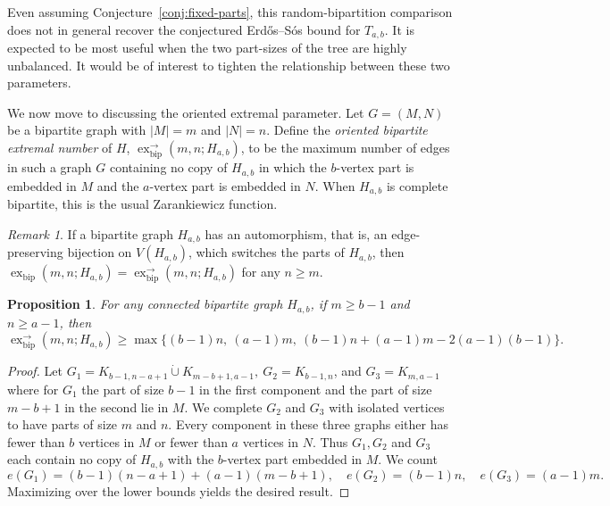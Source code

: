 \documentclass[12pt]{article}
\newtheorem{proposition}[theorem]{Proposition}
\theoremstyle{definition}
\theoremstyle{remark}
\newtheorem{remark}[theorem]{Remark}
\newcommand{\exbip}{\operatorname{ex}_{\mathrm{bip}}}
\newcommand{\exor}{\operatorname{ex}^{\rightarrow}_{\mathrm{bip}}}
\begin{document}
Even assuming Conjecture~\ref{conj:fixed-parts}, this random-bipartition comparison does not in general recover the conjectured Erd\H{o}s--S\'os bound for $T_{a,b}$. It is expected to be most useful when the two part-sizes of the tree are highly unbalanced. It would be of interest to tighten the relationship between these two parameters.

\medskip

We now move to discussing the oriented extremal parameter. Let $G=(M,N)$ be a bipartite graph with $|M|=m$ and $|N|=n$. Define the \textit{oriented bipartite extremal number} of $H$, $\exor(m,n;H_{a,b})$, to be the maximum number of edges in such a graph $G$ containing no copy of $H_{a,b}$ in which the $b$-vertex part is embedded in $M$ and the $a$-vertex part is embedded in $N$. When $H_{a,b}$ is complete bipartite, this is the usual Zarankiewicz function.

\begin{remark}
    If a bipartite graph $H_{a,b}$ has an automorphism, that is, an edge-preserving bijection on $V(H_{a,b})$, which switches the parts of $H_{a,b}$, then $\exbip(m,n;H_{a,b})=\exor(m,n;H_{a,b})$ for any $n\geq m$.
\end{remark}

\begin{proposition}
\label{prop:exor-LB}
        For any connected bipartite graph $H_{a,b}$, if $m\ge b-1$ and $n\ge a-1$, then
    \[
        \exor(m,n;H_{a,b})\ge\max\{(b-1)n,\ (a-1)m,\ (b-1)n+(a-1)m-2(a-1)(b-1)\}.
    \]
\end{proposition}
\begin{proof}
    Let $G_1=K_{b-1,n-a+1}\dot\cup K_{m-b+1,a-1},\ G_2=K_{b-1,n}$, and $G_3=K_{m,a-1}$
where for $G_1$ the part of size $b-1$ in the first component and the part of size $m-b+1$ in the second lie in $M$. We complete $G_2$ and $G_3$ with isolated vertices to have parts of size $m$ and $n$. Every component in these three graphs either has fewer than $b$ vertices in $M$ or fewer than $a$ vertices in $N$. Thus $G_1, G_2$ and $G_3$ each contain no copy of $H_{a,b}$ with the $b$-vertex part embedded in $M$. We count
    \[
        e(G_1)=(b-1)(n-a+1)+(a-1)(m-b+1),\quad e(G_2)=(b-1)n,\quad e(G_3)=(a-1)m.
    \]
Maximizing over the lower bounds yields the desired result.
\end{proof}
\end{document}
